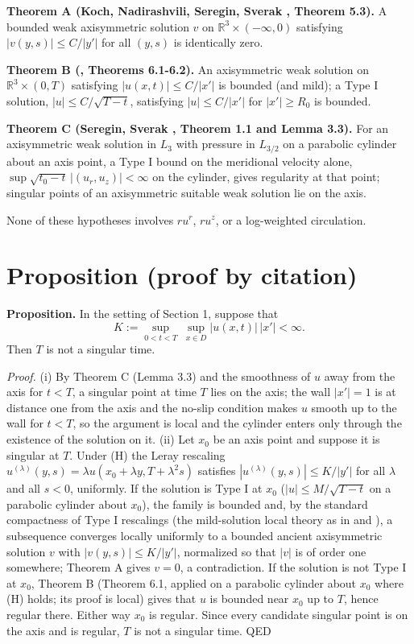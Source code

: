 \documentclass[11pt]{article}
\begin{document}
\noindent\textbf{Theorem A (Koch, Nadirashvili, Seregin, Sverak \cite{KNSS09}, Theorem 5.3).} A bounded weak axisymmetric solution $v$ on $\mathbb{R}^3 \times (-\infty, 0)$ satisfying $|v(y, s)| \le C / |y'|$ for all $(y, s)$ is identically zero.

\medskip
\noindent\textbf{Theorem B (\cite{KNSS09}, Theorems 6.1-6.2).} An axisymmetric weak solution on $\mathbb{R}^3 \times (0, T)$ satisfying $|u(x, t)| \le C / |x'|$ is bounded (and mild); a Type I solution, $|u| \le C / \sqrt{T - t}$, satisfying $|u| \le C / |x'|$ for $|x'| \ge R_0$ is bounded.

\medskip
\noindent\textbf{Theorem C (Seregin, Sverak \cite{SS09}, Theorem 1.1 and Lemma 3.3).} For an axisymmetric weak solution in $L_3$ with pressure in $L_{3/2}$ on a parabolic cylinder about an axis point, a Type I bound on the meridional velocity alone, $\sup \sqrt{t_0 - t}\, |(u_r, u_z)| < \infty$ on the cylinder, gives regularity at that point; singular points of an axisymmetric suitable weak solution lie on the axis.

\medskip
None of these hypotheses involves $r u^r$, $r u^z$, or a log-weighted circulation.

\section{Proposition (proof by citation)}

\noindent\textbf{Proposition.} In the setting of Section 1, suppose that
\begin{equation}
K := \sup_{0 < t < T}\ \sup_{x \in D} |u(x, t)|\,|x'| < \infty. \tag{H}
\end{equation}
Then $T$ is not a singular time.

\medskip
\emph{Proof.} (i) By Theorem C (Lemma 3.3) and the smoothness of $u$ away from the axis for $t < T$, a singular point at time $T$ lies on the axis; the wall $|x'| = 1$ is at distance one from the axis and the no-slip condition makes $u$ smooth up to the wall for $t < T$, so the argument is local and the cylinder enters only through the existence of the solution on it. (ii) Let $x_0$ be an axis point and suppose it is singular at $T$. Under (H) the Leray rescaling $u^{(\lambda)}(y, s) = \lambda u(x_0 + \lambda y, T + \lambda^2 s)$ satisfies $|u^{(\lambda)}(y, s)| \le K / |y'|$ for all $\lambda$ and all $s < 0$, uniformly. If the solution is Type I at $x_0$ ($|u| \le M / \sqrt{T - t}$ on a parabolic cylinder about $x_0$), the family is bounded and, by the standard compactness of Type I rescalings (the mild-solution local theory as in \cite{SS09} and \cite{AB19}), a subsequence converges locally uniformly to a bounded ancient axisymmetric solution $v$ with $|v(y, s)| \le K / |y'|$, normalized so that $|v|$ is of order one somewhere; Theorem A gives $v = 0$, a contradiction. If the solution is not Type I at $x_0$, Theorem B (Theorem 6.1, applied on a parabolic cylinder about $x_0$ where (H) holds; its proof is local) gives that $u$ is bounded near $x_0$ up to $T$, hence regular there. Either way $x_0$ is regular. Since every candidate singular point is on the axis and is regular, $T$ is not a singular time. QED
\end{document}
